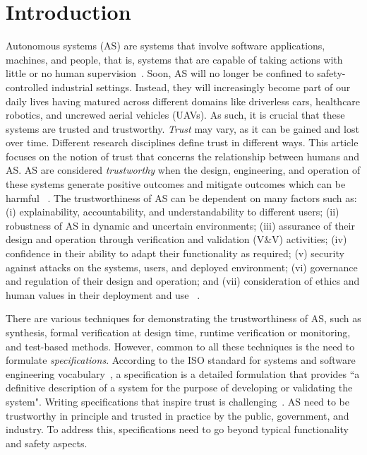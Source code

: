 \documentclass[sigconf,nonacm]{acmart}%
\begin{document}
	\section{Introduction}\label{introduction}
	Autonomous systems (AS) are systems that involve software applications, machines, and people, that is, systems that are capable of taking actions with little or no human supervision~\cite{Murukannaiah2020}. %
	Soon, AS will no longer be confined to safety-controlled industrial settings. Instead, they will increasingly become part of our daily lives having matured across different domains like driverless cars, healthcare robotics, and uncrewed aerial vehicles (UAVs). As such, it is crucial that these systems are trusted and trustworthy. \emph{Trust} may vary, as it can be gained and lost over time. Different research disciplines define trust in different ways. This article focuses on the notion of trust that concerns the relationship between humans and AS. AS are considered \emph{trustworthy} when the design, engineering, and operation of these systems generate positive outcomes and mitigate outcomes which can be harmful ~\cite{Naiseh2022}.
	The trustworthiness of AS can be dependent on many factors such as: (i) explainability, accountability, and understandability to different users; (ii) robustness of AS in dynamic and uncertain environments; (iii) assurance of their design and operation through verification and validation (V\&V) activities; (iv) confidence in their ability to adapt their functionality as required; (v) security against attacks on the systems, users, and deployed environment; (vi) governance and regulation of their design and operation; and (vii) consideration of ethics and human values in their deployment and use ~\cite{Naiseh2022}. 
	
	There are various techniques for demonstrating the trustworthiness of AS, such as synthesis, formal verification at design time, runtime verification or monitoring, and test-based methods. However, common to all these techniques is the need to formulate \emph{specifications}. According to the ISO standard for systems and software engineering vocabulary~\cite{ISO24765:2017}, a specification is a detailed formulation that provides ``a definitive description of a system for the purpose of developing or validating the system". Writing specifications that inspire trust is challenging~\cite{Kress-Gazit2021}. 
	AS need to be trustworthy in principle and trusted in practice by the public, government, and industry. 
	To address this, specifications need to go beyond typical functionality and safety aspects. 	
		
\end{document}

